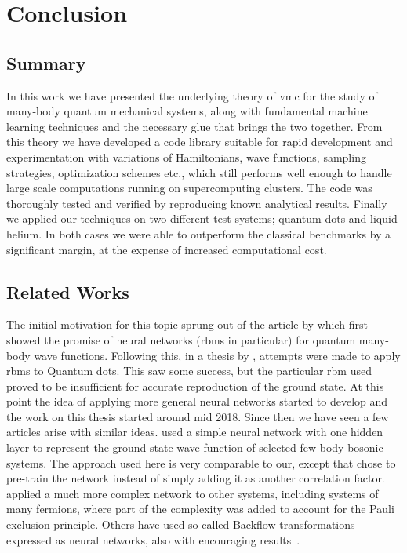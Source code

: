 \documentclass[Thesis.tex]{subfiles}
\begin{document}
\chapter{Conclusion}
\label{chp:conclusion}

\section{Summary}

In this work we have presented the underlying theory of \gls{vmc}
for the study of many-body quantum mechanical systems, along
with fundamental machine learning techniques and the necessary glue that
brings the two together. From this theory we have developed a code
library suitable for rapid development and experimentation with
variations of Hamiltonians, wave functions, sampling strategies,
optimization schemes etc., which still performs well enough to
handle large scale computations running on supercomputing clusters. The
code was thoroughly tested and verified by reproducing known analytical
results. Finally we applied our techniques on two different test
systems; quantum dots and liquid helium. In both cases we were able to
outperform the classical benchmarks by a significant margin, at the
expense of increased computational cost.


\section{Related Works}

The initial motivation for this topic sprung out of the article by
\textcite{Carleo602} which first showed the promise of neural networks (\glspl{rbm} in
particular) for quantum many-body wave functions. Following this, in a thesis by
\textcite{Flugsrud-2018}, attempts were made to apply \glspl{rbm} to Quantum dots. This
saw some success, but the particular \gls{rbm} used proved to be insufficient for
accurate reproduction of the ground state. At this point the idea of applying
more general neural networks started to develop and the work on this thesis
started around mid 2018. Since then we have seen a few articles arise with
similar ideas. \textcite{Saito-2018} used a simple neural network with one
hidden layer to represent the ground state wave function of
selected few-body bosonic systems. The approach used here is very comparable to our,
except that \citeauthor{Saito-2018} chose to pre-train the network instead of
simply adding it as another correlation factor. \textcite{Han-2018} applied a
much more complex network to other systems, including systems of many fermions,
where part of the complexity was added to account for the Pauli exclusion
principle. Others have used so called Backflow transformations expressed as
neural networks, also with encouraging results~\cite{ruggeri2018,Luo-2019}.
\end{document}
